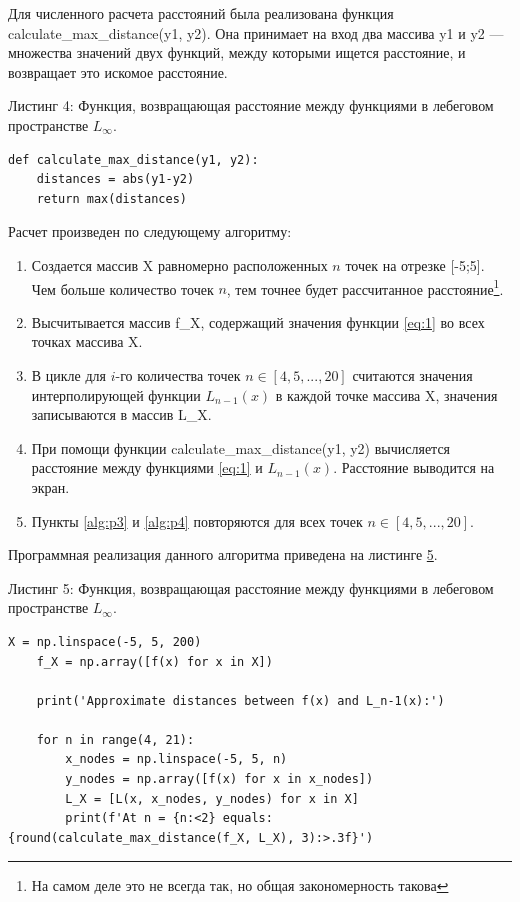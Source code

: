 Для численного расчета расстояний была реализована функция calculate\_max\_distance(y1, y2). Она принимает на вход два массива y1 и y2 — множества значений двух функций, между которыми ищется расстояние, и возвращает это искомое расстояние.
\pagebreak

Листинг 4: Функция, возвращающая расстояние между функциями в лебеговом пространстве $L_{\infty}$.
\begin{lstlisting}[label={lst:listing4}]
def calculate_max_distance(y1, y2):
    distances = abs(y1-y2)
    return max(distances)
\end{lstlisting}

Расчет произведен по следующему алгоритму:
\begin{enumerate}
    \item Создается массив X равномерно расположенных $n$ точек на отрезке [-5;5]. Чем больше 
 количество точек $n$, тем точнее будет рассчитанное расстояние\footnote{На самом деле это не всегда так, но общая закономерность такова}.
    \item Высчитывается массив f\_X, содержащий значения функции \eqref{eq:1} во всех точках массива X.
    \item В цикле для $i$-го количества точек $n \in [4,5,...,20]$ считаются значения интерполирующей функции $L_{n-1}(x)$ в каждой точке массива X, значения записываются в массив L\_X.\label{alg:p3}
    \item При помощи функции calculate\_max\_distance(y1, y2) вычисляется расстояние между функциями \eqref{eq:1} и $L_{n-1}(x)$. Расстояние выводится на экран.\label{alg:p4}
    \item Пункты \ref{alg:p3} и \ref{alg:p4} повторяются для всех точек $n \in [4,5,...,20]$.
\end{enumerate}

Программная реализация данного алгоритма приведена на листинге \hyperref[lst:listing5]{5}.

Листинг 5: Функция, возвращающая расстояние между функциями в лебеговом пространстве $L_{\infty}$.
\begin{lstlisting}[label={lst:listing5}]
    X = np.linspace(-5, 5, 200)
    f_X = np.array([f(x) for x in X])
    
    print('Approximate distances between f(x) and L_n-1(x):')
    
    for n in range(4, 21):
        x_nodes = np.linspace(-5, 5, n)
        y_nodes = np.array([f(x) for x in x_nodes])
        L_X = [L(x, x_nodes, y_nodes) for x in X]
        print(f'At n = {n:<2} equals: {round(calculate_max_distance(f_X, L_X), 3):>.3f}')
\end{lstlisting}

